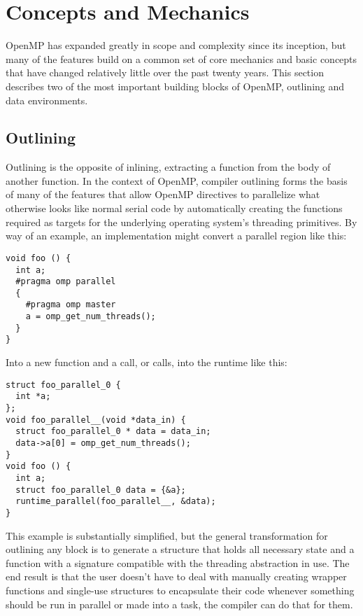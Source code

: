 \section{Concepts and Mechanics}
\label{sec:concepts}

OpenMP has expanded greatly in scope and complexity since its inception, but
many of the features build on a common set of core mechanics and basic concepts
that have changed relatively little over the past twenty years.  This section
describes two of the most important building blocks of OpenMP, outlining and
data environments.

\subsection{Outlining}
\label{sub:outlining}

Outlining is the opposite of inlining, extracting a function from the body
of another function.  In the context of OpenMP, compiler outlining forms the
basis of many of the features that allow OpenMP directives to parallelize what
otherwise looks like normal serial code by automatically creating the functions
required as targets for the underlying operating system's threading primitives.
By way of an example, an implementation might convert a parallel region like
this:

\begin{verbatim}
void foo () {
  int a;
  #pragma omp parallel
  {
    #pragma omp master
    a = omp_get_num_threads();
  }
}
\end{verbatim}

Into a new function and a call, or calls, into the runtime like this:

\begin{verbatim}
struct foo_parallel_0 {
  int *a;
};
void foo_parallel__(void *data_in) {
  struct foo_parallel_0 * data = data_in;
  data->a[0] = omp_get_num_threads();
}
void foo () {
  int a;
  struct foo_parallel_0 data = {&a};
  runtime_parallel(foo_parallel__, &data);
}
\end{verbatim}

This example is substantially simplified, but the general transformation for
outlining any block is to generate a structure that holds all necessary state
and a function with a signature compatible with the threading abstraction in
use.  The end result is that the user doesn't have to deal with manually
creating wrapper functions and single-use structures to encapsulate their code
whenever something should be run in parallel or made into a task, the compiler
can do that for them.


